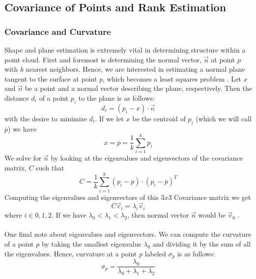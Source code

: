 \documentclass[11pt]{article}
\theoremstyle{definition}
\begin{document}
\subsection{Covariance of Points and Rank Estimation}\label{sub:Cov_Rank}
\subsubsection{Covariance and Curvature}\label{subsub:cov}
Shape and plane estimation is extremely vital in determining structure within a point cloud.   First and foremost is determining the normal vector, $\vec{n}$ at point $p$ with $k$ nearest neighbors.  Hence, we are interested in estimating a normal plane tangent to the surface at point $p$, which becomes a least squares problem \cite{RusuDoctoralDissertation}.  Let $x$ and $\vec{n}$ be a point and a normal vector describing the plane, respectively.  Then the distance $d_i$ of a point $p_i$ to the plane is as follows:
\begin{equation}\label{eqn:least_square}
d_i = (p_i - x)\cdot{\vec{n}}
\end{equation}
with the desire to minimize $d_i$.   If we let $x$ be the centroid of $p_i$ (which we will call $\overline{p}$) we have
\begin{equation}\label{eqn:centroid}
x = \overline{p} = \frac{1}{k}\sum_{i=1}^{k}p_i
\end{equation}
We solve for $\vec{n}$ by looking at the eigenvalues and eigenvectors of the covariance matrix, $C$ such that
\begin{equation}\label{eqn:cov}
C = \frac{1}{k}\sum_{i=1}^{k}(p_i - \overline{p})\cdot(p_i - \overline{p})^T
\end{equation}
Computing the eigenvalues and eigenvectors of this $3x3$ Covariance matrix we get 
\begin{equation}\label{eqn:eigen}
C\vec{v}_i = \lambda_i\vec{v}_i 
\end{equation}
where $i \in {0,1,2}$.  If we have $\lambda_0 < \lambda_1 < \lambda_2$, then normal vector $\vec{n}$ would be $\vec{v}_0$ \cite{RusuDoctoralDissertation}.  
\\\\
One final note about eigenvalues and eigenvectors.  We can compute the curvature of a point $p$ by taking the smallest eigenvalue $\lambda_0$ and dividing it by the sum of all the eigenvalues.  Hence, curvature at a point $p$ labeled $\sigma_p$ is as follows:
\begin{equation}\label{eqn:curvature}
\sigma_p = \frac{\lambda_0}{\lambda_0 + \lambda_1 + \lambda_2}
\end{equation}
\end{document}
